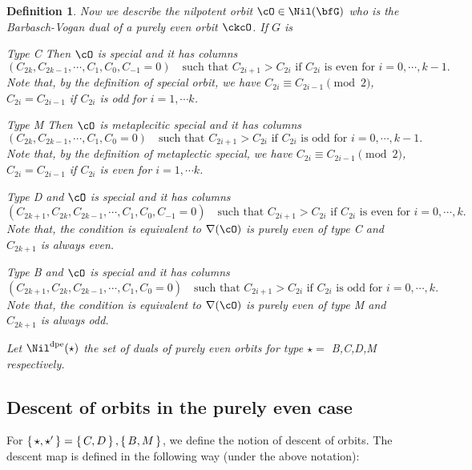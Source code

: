 \documentclass[12pt,a4paper]{amsart}
\def\DD{\nabla}
\numberwithin{equation}{section}
\newtheorem{defn}[thm]{Definition}
\theoremstyle{remark}
\def\dpeNil{\Nil^{\mathrm{dpe}}}
\newcommand{\ess}{essential }
\begin{document}
\begin{defn} \label{def:pe}
  Now we describe the nilpotent orbit $\cO\in \Nil(\bfG)$ who is the
  Barbasch-Vogan dual of a purely even orbit $\ckcO$. If $G$ is
  \begin{des}
    \item [Type C] Then
          $\cO$ is special and it has columns
          \[
            ( C_{2k},C_{2k-1},\cdots, C_{1},C_{0}, C_{-1}=0 )
            \quad \text{such that } C_{2i+1}>C_{2i} \text{ if } C_{2i} \text{ is even for
            } i=0, \cdots, k-1.
          \]
           Note that, by the
          definition of special orbit,
          we have $C_{2i}\equiv C_{2i-1} \pmod{2}$, $C_{2i} = C_{2i-1}$ if
          $C_{2i}$ is odd for $i = 1, \cdots k$.
    \item [Type M] Then
          $\cO$ is metaplecitic special and it has columns
          \[
            ( C_{2k},C_{2k-1},\cdots, C_{1},C_{0}=0 )
            \quad \text{such that } C_{2i+1}>C_{2i} \text{ if } C_{2i} \text{ is odd for } i=0, \cdots, k-1.
          \]
          Note that, by the
          definition of metaplectic special,
          we have $C_{2i}\equiv C_{2i-1} \pmod{2}$, $C_{2i} = C_{2i-1}$ if
          $C_{2i}$ is even
          for $i = 1, \cdots k$.
    \item [Type D] and $\cO$ is special and it has columns
          \[
            ( C_{2k+1},C_{2k},C_{2k-1},\cdots, C_{1},C_{0}, C_{-1}=0 )
            \quad \text{such that } C_{2i+1}>C_{2i} \text{ if } C_{2i} \text{ is
              even for } i=0, \cdots, k.
          \]
          Note that, the
          condition is equivalent to $\DD(\cO)$ is purely even of type C and
          $C_{2k+1}$ is always even.
    \item [Type B] and $\cO$ is special and it has columns
          \[
            ( C_{2k+1},C_{2k},C_{2k-1},\cdots, C_{1},C_{0} =0 )
            \quad \text{such that } C_{2i+1}>C_{2i} \text{ if } C_{2i} \text{ is
              odd for } i=0, \cdots, k.
          \]
          Note that, the condition is equivalent to $\DD(\cO)$ is purely even of type M and
          $C_{2k+1}$ is always odd.
  \end{des}
  Let $\dpeNil(\star)$ the set of duals of purely even
  orbits for type $\star=$ B,C,D,M respectively.

\end{defn}


\subsection{Descent of orbits in the purely even case}
  For $\set{\star,\star'} = \set{C,D}, \set{B,M}$, we define the notion of
  descent of orbits. The descent map is defined in the following way
  (under the above notation):
\end{document}
